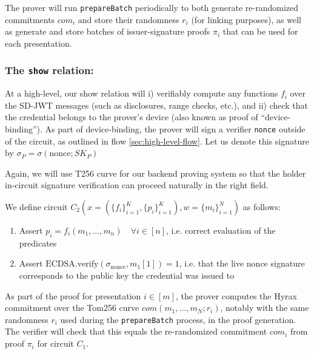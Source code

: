 The prover will run \texttt{prepareBatch} periodically to both generate re-randomized commitments $com_i$ and store their randomness $r_i$ (for linking purposes), as well as generate and store batches of issuer-signature proofs $\pi_i$ that can be used for each presentation.

\subsubsection{The \texttt{show} relation:}

At a high-level, our show relation will i) verifiably compute any functions $f_i$ over the SD-JWT messages (such as disclosures, range checks, etc.),
and ii) check that the credential belongs to the prover's device (also known as proof of ``device-binding''). 
As part of device-binding, the prover will sign a verifier \texttt{nonce} outside of the circuit, as outlined in flow \ref{sec:high-level-flow}. 
Let us denote this signature by $\sigma_P = \sigma(\text{nonce}; SK_P)$

Again, we will use T256 curve for our backend proving system so that the holder in-circuit signature verification can proceed naturally in the right field.

\begin{mdframed}[style=zkprotocolwithheader, frametitle=Circuit $C_2$ for the \texttt{show} relation]

We define circuit $C_2(x = (\{f_i\}_{i=1}^K, \{p_i\}_{i=1}^K), w = \{m_i\}_{i=1}^N)$ as follows:

\begin{enumerate}
\item Assert $p_i = f_i(m_1, \dots, m_n) \quad \forall i \in [n]$, i.e. correct evaluation of the predicates
\item Assert $\text{ECDSA.verify}(\sigma_{\text{nonce}}, m_1[1]) = 1$, i.e. that the live nonce signature corresponds to the public key the credential was issued to
\end{enumerate}

\end{mdframed}

As part of the proof for presentation $i \in [m]$, the prover computes the Hyrax commitment over the Tom256 curve $com(m_1, \dots, m_N; r_i)$, 
notably with the same randomness $r_i$ used during the \texttt{prepareBatch} process, in the proof generation. 
The verifier will check that this equals the re-randomized commitment $com_i$ from proof $\pi_i$ for circuit $C_1$. 

